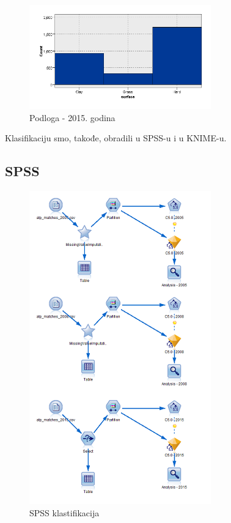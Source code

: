 \documentclass[a4paper]{article}
\begin{document}
\begin{figure}[H]
	\begin{center}
		\includegraphics[width=0.7\textwidth]{Klasifikacija/HistogramiPodlogaTerena/Graphboard2015.png}
	\end{center}
	\caption{Podloga - 2015. godina}
	\label{fig:Podloga2015}
\end{figure}

Klasifikaciju smo, takođe, obradili u SPSS-u i u KNIME-u.

\subsection{SPSS}

\begin{figure}[H]
	\begin{center}
		\includegraphics[width=0.7\textwidth]{Klasifikacija/C50/SPSS_C50_Surface.png}
	\end{center}
	\caption{SPSS klastifikacija}
	\label{fig:SPSS_CvoroviKlasifikacija}
\end{figure}
\end{document}
